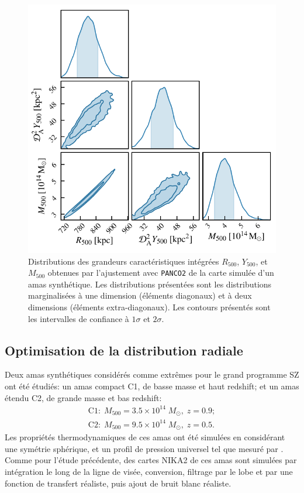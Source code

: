 \begin{figure}[t]
    \centering
    \includegraphics[width=.6\linewidth]{Figures/Chap_panco/demo_plots/integrated_values.pdf}
    \caption{
        Distributions des grandeurs caractéristiques intégrées $R_{500}$, $Y_{500}$, et $M_{500}$ obtenues par l'ajustement avec \texttt{PANCO2} de la carte simulée d'un amas synthétique.
        Les distributions présentées sont les distributions marginalisées à une dimension (éléments diagonaux) et à deux dimensions (éléments extra-diagonaux).
        Les contours présentés sont les intervalles de confiance à $1\sigma$ et $2\sigma$.
    }
    \label{fig:panco2:actlike_integ}
\end{figure}

\subsection{Optimisation de la distribution radiale} \label{sec:panco:binning}

Deux amas synthétiques considérés comme extrêmes pour le grand programme SZ ont été étudiés: un amas compact C1, de basse masse et haut redshift; et un amas étendu C2, de grande masse et bas redshift:
\begin{align}
    \label{eq:panco:synth_clusters}
    \nonumber \text{C1}: \; M_{500} = 3.5 \times 10^{14} \; M_\odot, \; z=0.9 ; \\
              \text{C2}: \; M_{500} = 9.5 \times 10^{14} \; M_\odot, \; z=0.5 .
\end{align}
Les propriétés thermodynamiques de ces amas ont été simulées en considérant une symétrie sphérique, et un profil de pression universel tel que mesuré par .
Comme pour l'étude précédente, des cartes NIKA2 de ces amas sont simulées par intégration le long de la ligne de visée, conversion, filtrage par le lobe et par une fonction de transfert réaliste, puis ajout de bruit blanc réaliste.

